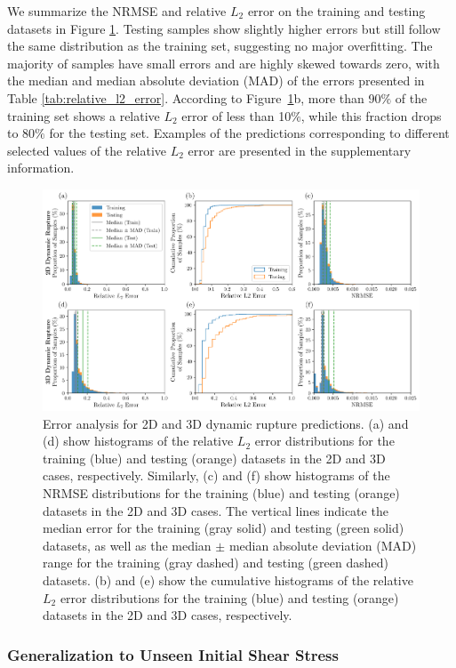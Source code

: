 \documentclass[draft]{agujournal2019}
\begin{document}
We summarize the NRMSE and relative \(L_2\) error on the training and testing datasets in Figure \ref{fig:l2}. Testing samples show slightly higher errors but still follow the same distribution as the training set, suggesting no major overfitting. The majority of samples have small errors and are highly skewed towards zero, with the median and median absolute deviation (MAD) of the errors presented in Table \ref{tab:relative_l2_error}. According to Figure~\ref{fig:l2}b, more than 90\(\%\) of the training set shows a relative \(L_2\) error of less than 10\(\%\), while this fraction drops to 80\(\%\) for the testing set. Examples of the predictions corresponding to different selected values of the relative \(L_2\) error are presented in the supplementary information. 

\begin{figure}
\centering
\includegraphics[width=0.9\linewidth]{stats_R3.png}
\caption{\label{fig:l2}Error analysis for 2D and 3D dynamic rupture predictions. (a) and (d) show histograms of the relative $L_2$ error distributions for the training (blue) and testing (orange) datasets in the 2D and 3D cases, respectively. Similarly, (c) and (f) show histograms of the NRMSE distributions for the training (blue) and testing (orange) datasets in the 2D and 3D cases. The vertical lines indicate the median error for the training (gray solid) and testing (green solid) datasets, as well as the median $\pm$ median absolute deviation (MAD) range for the training (gray dashed) and testing (green dashed) datasets. (b) and (e) show the cumulative histograms of the relative $L_2$ error distributions for the training (blue) and testing (orange) datasets in the 2D and 3D cases, respectively.
}
\end{figure}


\subsubsection{Generalization to Unseen Initial Shear Stress}
\label{sec:FNO-1D_unseen_shear}
\end{document}
